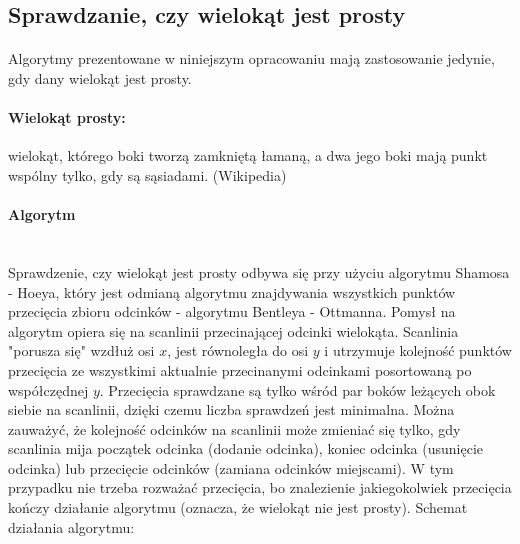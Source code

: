 \documentclass{article}
\begin{document}
\subsection{Sprawdzanie, czy wielokąt jest prosty}
\paragraph{}Algorytmy prezentowane w niniejszym opracowaniu mają zastosowanie jedynie, gdy dany wielokąt jest prosty.
\paragraph{Wielokąt prosty:} wielokąt, którego boki tworzą zamkniętą łamaną, a dwa jego boki mają punkt wspólny tylko, gdy są sąsiadami. (Wikipedia)
\paragraph{Algorytm}\mbox{}\\
Sprawdzenie, czy wielokąt jest prosty odbywa się przy użyciu algorytmu Shamosa - Hoeya, który jest odmianą algorytmu znajdywania wszystkich punktów przecięcia zbioru odcinków - algorytmu Bentleya - Ottmanna. Pomysł na algorytm opiera się na scanlinii przecinającej odcinki wielokąta. Scanlinia "porusza się" wzdłuż osi $x$, jest równoległa do osi $y$ i utrzymuje kolejność punktów przecięcia ze wszystkimi aktualnie przecinanymi odcinkami posortowaną po współczędnej $y$. Przecięcia sprawdzane są tylko wśród par boków leżących obok siebie na scanlinii, dzięki czemu liczba sprawdzeń jest minimalna. Można zauważyć, że kolejność odcinków na scanlinii może zmieniać się tylko, gdy scanlinia mija początek odcinka (dodanie odcinka), koniec odcinka (usunięcie odcinka) lub przecięcie odcinków (zamiana odcinków miejscami). W tym przypadku nie trzeba rozważać przecięcia, bo znalezienie jakiegokolwiek przecięcia kończy działanie algorytmu (oznacza, że wielokąt nie jest prosty). Schemat działania algorytmu:
\end{document}
